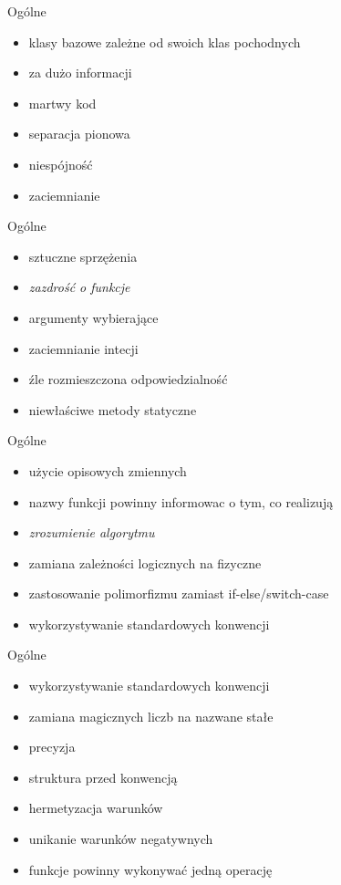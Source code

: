 \begin{frame}{Ogólne}
\begin{itemize}
	\item klasy bazowe zależne od swoich klas pochodnych
	\item za dużo informacji
	\item martwy kod
	\item separacja pionowa
	\item niespójność
	\item zaciemnianie
\end{itemize}
\end{frame}

\begin{frame}{Ogólne}
\begin{itemize}
	\item sztuczne sprzężenia
	\item \emph{zazdrość o funkcje}
	\item argumenty wybierające
	\item zaciemnianie intecji
	\item źle rozmieszczona odpowiedzialność
	\item niewłaściwe metody statyczne
\end{itemize}
\end{frame}

\begin{frame}{Ogólne}
\begin{itemize}	
	\item użycie opisowych zmiennych
	\item nazwy funkcji powinny informowac o tym, co realizują
	\item \emph{zrozumienie algorytmu}
	\item zamiana zależności logicznych na fizyczne
	\item zastosowanie polimorfizmu zamiast if-else/switch-case
	\item wykorzystywanie standardowych konwencji
\end{itemize}
\end{frame}

\begin{frame}{Ogólne}
\begin{itemize}	
	\item wykorzystywanie standardowych konwencji
	\item zamiana magicznych liczb na nazwane stałe
	\item precyzja
	\item struktura przed konwencją
	\item hermetyzacja warunków
	\item unikanie warunków negatywnych
	\item funkcje powinny wykonywać jedną operację
\end{itemize}
\end{frame}

